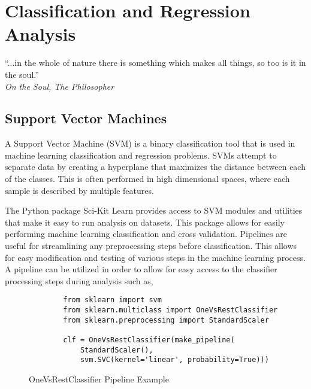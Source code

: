 \chapter{Classification and Regression Analysis}
\begin{center}
  \begin{minipage}{0.75\textwidth}
    \begin{small}
      “...in the whole of nature there is something which makes all things, so too is it in the soul.”\\
      \null\hfill\emph{On the Soul, The Philosopher}
    \end{small}
  \end{minipage}
  \vspace{0.5cm}
\end{center}

\section{Support Vector Machines}
A Support Vector Machine (SVM) is a binary classification tool that is used in machine learning classification and regression problems.  SVMs attempt to separate data by creating a hyperplane that maximizes the distance between each of the classes.  This is often performed in high dimensional spaces, where each sample is described by multiple features.

The Python package Sci-Kit Learn provides access to SVM modules and utilities that make it easy to run analysis on datasets.  This package allows for easily performing machine learning classification and cross validation.  Pipelines are useful for streamlining any preprocessing steps before classification.  This allows for easy modification and testing of various steps in the machine learning process.  A pipeline can be utilized in order to allow for easy access to the classifier processing steps during analysis such as,
%
\begin{figure}
    \begin{lstlisting}
        from sklearn import svm
        from sklearn.multiclass import OneVsRestClassifier
        from sklearn.preprocessing import StandardScaler

        clf = OneVsRestClassifier(make_pipeline(
            StandardScaler(),
            svm.SVC(kernel='linear', probability=True)))
    \end{lstlisting}
    \caption{OneVsRestClassifier Pipeline Example}
    \label{fig:scattering}
\end{figure}

